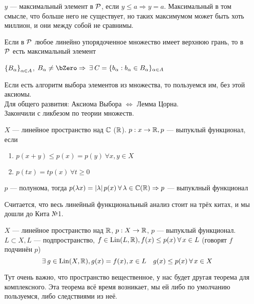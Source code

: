 \documentclass[document]{subfiles}
\begin{document}
\begin{definition}
    $y$ --- максимальный элемент в $\mathcal{P}$, если $y \leq a \Rightarrow y = a$.
    Максимальный в том смысле, что больше него не существует, но таких максимумом может быть хоть миллион, и они между собой не сравнимы.
\end{definition}


\begin{lemma*}[Цорн]
    Если в $\mathcal{P}$ любое линейно упорядоченное множество имеет верхнюю грань, то в $\mathcal{P}$ есть максимальный элемент
\end{lemma*}

\begin{axiom*}[Выбора]
    $\left\{B_\alpha\right\}_{\alpha \in A}$, $B_\alpha \ne \bZero \Rightarrow \: \exists C = \{ b_\alpha: b_\alpha \in B_\alpha \}_{\alpha \in A}$
\end{axiom*}
Если есть алгоритм выбора элементов из множества, то пользуемся им, без этой аксиомы. \\

Для общего развития: Аксиома Выбора $\Leftrightarrow$ Лемма Цорна. \\ 
Закончили с ликбезом по теории множеств.

\begin{definition}
    $X$ --- линейное пространство над $\mathbb{C}$ ($\mathbb{R}$). $p: x \rightarrow \mathbb{R}, p$ --- выпуклый функционал, если 
    \begin{enumerate}
        \item $p(x+y) \leq p(x) = p(y) \: \forall x,y \in X$ 
        \item $p(tx) = tp(x) \: \forall t \geq 0$
    \end{enumerate} 
\end{definition}

\begin{remark}
    $p$ --- полунома, тогда $p(\lambda x) = \abs{\lambda} p(x) \: \forall \lambda \in \bC (\bR) \Rightarrow p$ --- выпуклный функционал
\end{remark}

Считается, что весь линейный функциональный анализ стоит на трёх китах, и мы дошли до Кита №1.
\begin{theorem}
    $X$ --- линейное пространство над $\mathbb{R}$, $p: X \rightarrow \mathbb{R}$, $p$ --- выпуклый функционал.
    $L \subset X, L$ --- подпространство, $f \in \Lin(L, \bR), f(x) \leq p(x) \: \forall x \in L$ (говорят $f$ подчинён $p$)
    \[ \exists g \in \Lin(X, \bR), g(x) = f(x), x \in L \quad g(x) \leq p(x) \: \forall x \in X \]
\end{theorem}
Тут очень важно, что пространство вещественное, у нас будет другая теорема для комплексного. Эта теорема всё время возникает, мы ей либо по умолчанию пользуемся, либо следствиями из неё.
\end{document}
